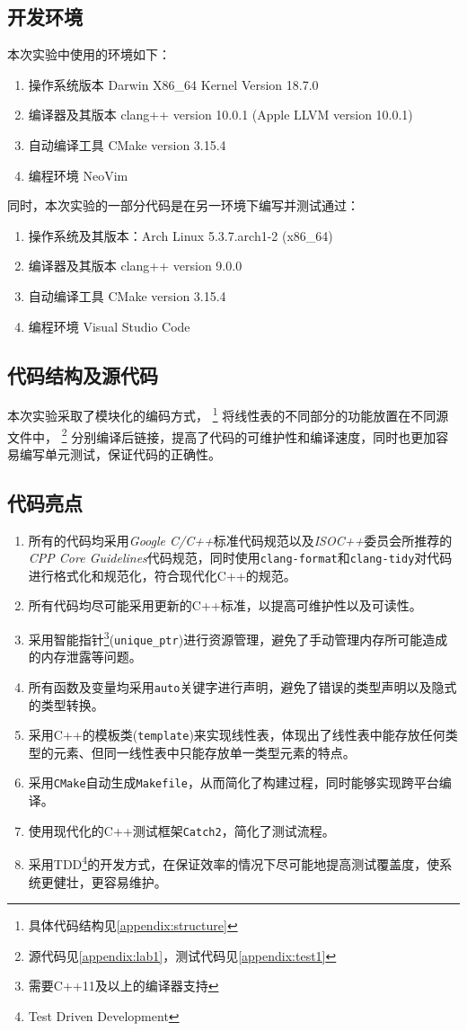 \subsection{开发环境}
本次实验中使用的环境如下：
\begin{enumerate}
    \item 操作系统版本 Darwin X86\_64 Kernel Version 18.7.0
    \item 编译器及其版本 clang++ version 10.0.1 (Apple LLVM version 10.0.1)
    \item 自动编译工具 CMake version 3.15.4
    \item 编程环境 NeoVim
\end{enumerate}
同时，本次实验的一部分代码是在另一环境下编写并测试通过：
\begin{enumerate}
    \item 操作系统及其版本：Arch Linux 5.3.7.arch1-2 (x86\_64)
    \item 编译器及其版本 clang++ version 9.0.0
    \item 自动编译工具 CMake version 3.15.4
    \item 编程环境 Visual Studio Code
\end{enumerate}
\subsection{代码结构及源代码}
本次实验采取了模块化的编码方式，
\footnote{具体代码结构见\autoref{appendix:structure}}
将线性表的不同部分的功能放置在不同源文件中，
\footnote{源代码见\autoref{appendix:lab1}，测试代码见\autoref{appendix:test1}}
分别编译后链接，提高了代码的可维护性和编译速度，同时也更加容易编写单元测试，保证代码的正确性。
\subsection{代码亮点}
\begin{enumerate}
        \item 所有的代码均采用\emph{Google
            C/C++}标准代码规范以及\emph{ISOC++}委员会所推荐的\emph{CPP Core Guidelines}代码规范，同时使用\texttt{clang-format}和\texttt{clang-tidy}对代码进行格式化和规范化，符合现代化C++的规范。
        \item 所有代码均尽可能采用更新的C++标准，以提高可维护性以及可读性。
        \item 采用智能指针\footnote{需要C++11及以上的编译器支持}(\texttt{unique\_ptr})进行资源管理，避免了手动管理内存所可能造成的内存泄露等问题。
        \item 所有函数及变量均采用\texttt{auto}关键字进行声明，避免了错误的类型声明以及隐式的类型转换。
        \item 采用C++的模板类(\texttt{template})来实现线性表，体现出了线性表中能存放任何类型的元素、但同一线性表中只能存放单一类型元素的特点。
        \item 采用\texttt{CMake}自动生成\texttt{Makefile}，从而简化了构建过程，同时能够实现跨平台编译。
        \item 使用现代化的C++测试框架\texttt{Catch2}，简化了测试流程。
        \item 采用TDD\footnote{Test Driven Development}的开发方式，在保证效率的情况下尽可能地提高测试覆盖度，使系统更健壮，更容易维护。
\end{enumerate}

